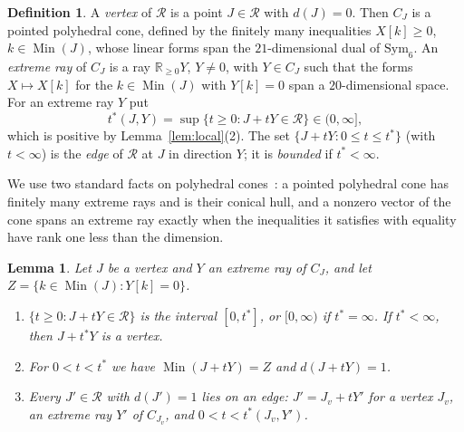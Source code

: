 \documentclass[11pt]{amsart}
\newtheorem{lemma}[theorem]{Lemma}
\theoremstyle{definition}
\newtheorem{definition}[theorem]{Definition}
\theoremstyle{remark}
\numberwithin{equation}{section}
\numberwithin{table}{section}
\numberwithin{figure}{section}
\newcommand{\R}{\mathbb{R}}
\newcommand{\Rk}{\mathcal{R}}
\newcommand{\Sym}{\mathrm{Sym}}
\newcommand{\Min}{\operatorname{Min}}
\begin{document}
\begin{definition}
A \emph{vertex} of $\Rk$ is a point $J\in\Rk$ with $d(J)=0$. Then $C_J$ is a pointed polyhedral cone, defined by the finitely many inequalities $X[k]\ge0$, $k\in\Min(J)$, whose linear forms span the $21$-dimensional dual of $\Sym_6$. An \emph{extreme ray} of $C_J$ is a ray $\R_{\ge0}Y$, $Y\ne0$, with $Y\in C_J$ such that the forms $X\mapsto X[k]$ for the $k\in\Min(J)$ with $Y[k]=0$ span a $20$-dimensional space. For an extreme ray $Y$ put
\[
t^*(J,Y)=\sup\{t\ge0:J+tY\in\Rk\}\in(0,\infty],
\]
which is positive by Lemma~\ref{lem:local}(2). The set $\{J+tY:0\le t\le t^*\}$ (with $t<\infty$) is the \emph{edge} of $\Rk$ at $J$ in direction $Y$; it is \emph{bounded} if $t^*<\infty$.
\end{definition}

We use two standard facts on polyhedral cones~\cite[Lecture~1]{Ziegler1995}: a pointed polyhedral cone has finitely many extreme rays and is their conical hull, and a nonzero vector of the cone spans an extreme ray exactly when the inequalities it satisfies with equality have rank one less than the dimension.

\begin{lemma}\label{lem:edges}
Let $J$ be a vertex and $Y$ an extreme ray of $C_J$, and let $Z=\{k\in\Min(J):Y[k]=0\}$.
\begin{enumerate}
\item $\{t\ge0:J+tY\in\Rk\}$ is the interval $[0,t^*]$, or $[0,\infty)$ if $t^*=\infty$. If $t^*<\infty$, then $J+t^*Y$ is a vertex.
\item For $0<t<t^*$ we have $\Min(J+tY)=Z$ and $d(J+tY)=1$.
\item Every $J'\in\Rk$ with $d(J')=1$ lies on an edge: $J'=J_v+tY'$ for a vertex $J_v$, an extreme ray $Y'$ of $C_{J_v}$, and $0<t<t^*(J_v,Y')$.
\end{enumerate}
\end{lemma}
\end{document}
